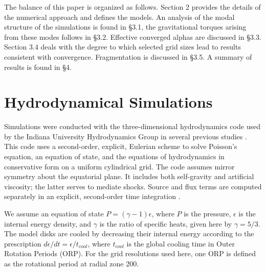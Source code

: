 \documentclass[manuscript]{aastex}
\begin{document}
The balance of this paper is organized as follows.  Section 2 provides the details of the numerical approach and defines the models.  An analysis of the modal structure of the simulations 
is found in \S3.1, the gravitational torques arising from these modes follows in \S3.2.  Effective converged alphas are 
discussed in \S3.3.  Section 3.4 deals with the degree to which selected grid sizes lead to results consistent with
convergence.  Fragmentation is discussed in \S3.5.  A summary of results is found in \S4.




\section{Hydrodynamical Simulations}

Simulations were conducted with the three-dimensional hydrodynamics code used by the Indiana University Hydrodynamics Group in several previous studies \citep{pickett1998, pickett2000, mejiaphd2004, mejia2005, boley2006, cai2008}.  This code uses a second-order, explicit, Eulerian scheme to solve Poisson's equation, an equation of state, and the equations of hydrodynamics in conservative form on a uniform cylindrical grid.  The code assumes mirror symmetry about the equatorial plane. It includes both self-gravity and artificial viscosity; the latter serves to 
mediate shocks. Source and flux terms \citep{norman1986} are computed separately in an explicit, second-order time integration \citep{albada1982,christodoulou1991,yangphd1992}.

We assume an equation of state $P = (\gamma -1)\epsilon$, where $P$ is the pressure, $\epsilon$ is the internal energy density, and $\gamma$ is the ratio of specific heats, given here by $\gamma = 5/3$.  The model disks are cooled by decreasing their internal energy according to the prescription $d\epsilon/dt = \epsilon / t_{cool}$, where $t_{cool}$ is the global cooling time in Outer Rotation Periods (ORP).  For the grid resolutions used here, one ORP is defined as the rotational period at radial zone 200.

\end{document}
